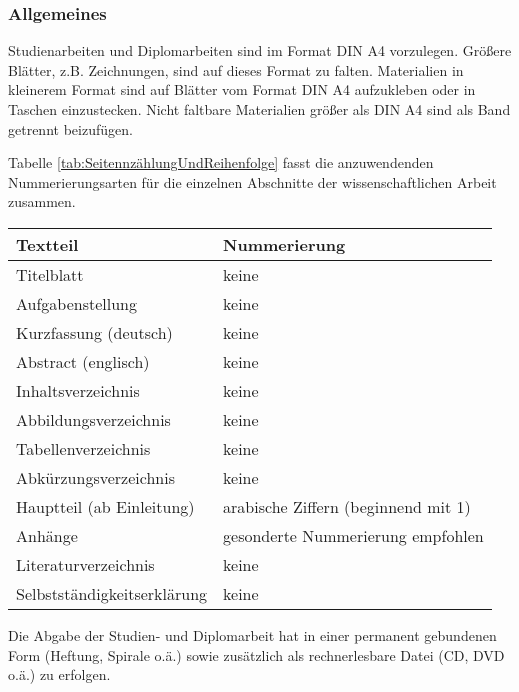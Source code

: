 \subsubsection{Allgemeines}
\label{sec:Allgemeines3}

Studienarbeiten und Diplomarbeiten sind im Format DIN A4 vorzulegen. Größere Blätter, z.B. Zeichnungen, sind auf dieses Format zu falten. Materialien in kleinerem Format sind auf Blätter vom Format DIN A4 aufzukleben oder in Taschen einzustecken. Nicht faltbare Materialien größer als DIN A4 sind als Band getrennt beizufügen.

Tabelle \ref{tab:SeitennzählungUndReihenfolge} fasst die anzuwendenden Nummerierungsarten für die einzelnen Abschnitte der wissenschaftlichen Arbeit zusammen.

\begin{table*}[ht]
  \centering
    \caption{Seitenzählung und Reihenfolge}
    \label{tab:SeitennzählungUndReihenfolge}
    \begin{tabular}{ll}
      \toprule
      Textteil                      & Nummerierung \\
      \midrule
      Titelblatt                    & keine \\
       Aufgabenstellung             & keine \\
       Kurzfassung (deutsch)        & keine \\
       Abstract (englisch)          & keine \\
       Inhaltsverzeichnis           & keine \\
       Abbildungsverzeichnis        & keine \\
       Tabellenverzeichnis          & keine \\
       Abkürzungsverzeichnis        & keine \\
       Hauptteil (ab Einleitung)    &  arabische Ziffern (beginnend mit 1)\\
       Anhänge                      & gesonderte Nummerierung empfohlen \\
       Literaturverzeichnis         & keine \\
       Selbstständigkeitserklärung  & keine \\
       \bottomrule
    \end{tabular}
\end{table*}

Die Abgabe der Studien- und Diplomarbeit hat in einer permanent gebundenen Form
(Heftung, Spirale o.ä.) sowie zusätzlich als rechnerlesbare Datei (CD,
DVD o.ä.) zu erfolgen.


